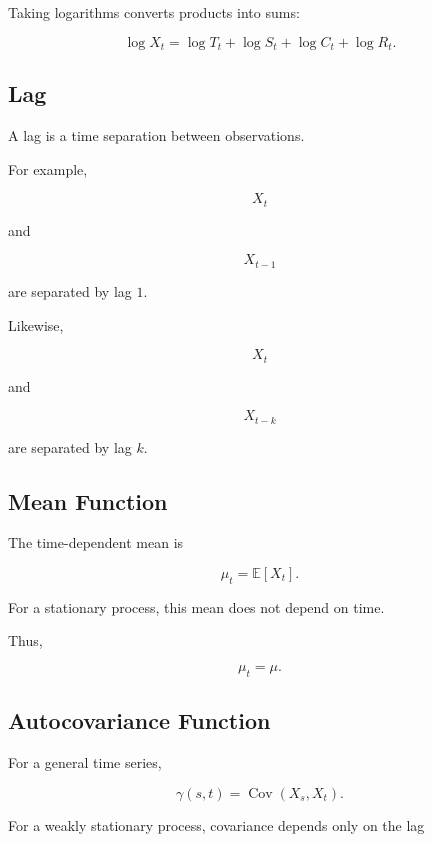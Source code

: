Taking logarithms converts products into sums:

\[
\boxed{
\log X_t
=
\log T_t
+
\log S_t
+
\log C_t
+
\log R_t.
}
\]

\subsection{Lag}
\label{subsec:time-series-lag}

A lag is a time separation between observations.

For example,

\[
X_t
\]

and

\[
X_{t-1}
\]

are separated by lag \(1\).

Likewise,

\[
X_t
\]

and

\[
X_{t-k}
\]

are separated by lag \(k\).

\subsection{Mean Function}
\label{subsec:time-series-mean-function}

The time-dependent mean is

\[
\boxed{
\mu_t
=
\mathbb{E}[X_t].
}
\]

For a stationary process, this mean does not depend on time.

Thus,

\[
\boxed{
\mu_t=\mu.
}
\]

\subsection{Autocovariance Function}
\label{subsec:autocovariance-function}

For a general time series,

\[
\boxed{
\gamma(s,t)
=
\operatorname{Cov}(X_s,X_t).
}
\]

For a weakly stationary process, covariance depends only on the lag

